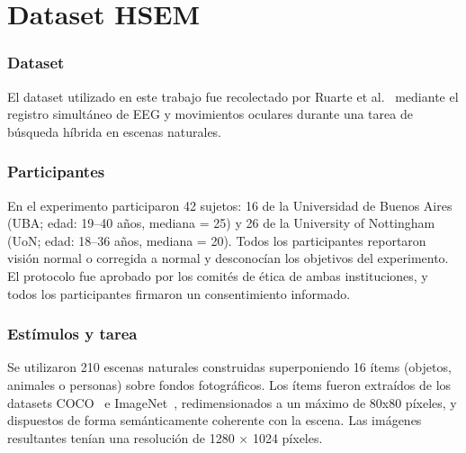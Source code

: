 \section{Dataset HSEM}
\label{sec:dataset_hsem}


\subsubsection{Dataset}


El dataset utilizado en este trabajo fue recolectado por
Ruarte et al.~\citep{ruarte2025} mediante el registro simultáneo de EEG y movimientos 
oculares durante una tarea de búsqueda híbrida en escenas naturales.

\subsubsection{Participantes}

En el experimento participaron 42 sujetos: 16 de la Universidad de Buenos Aires (UBA; edad: 19--40 años, mediana = 25) y 26 de la University of Nottingham (UoN; edad: 18--36 años, mediana = 20). Todos los participantes reportaron visión normal o corregida a normal y desconocían los objetivos del 
experimento. El protocolo fue aprobado por los comités de ética de ambas 
instituciones, y todos los participantes firmaron un consentimiento 
informado.

\subsubsection{Estímulos y tarea}

Se utilizaron 210 escenas naturales construidas superponiendo 16 ítems 
(objetos, animales o personas) sobre fondos fotográficos. 
Los ítems fueron extraídos de los datasets COCO~\citep{lin2014coco} e ImageNet~\citep{deng2009imagenet}, redimensionados a un máximo de 80x80 píxeles, y dispuestos de forma semánticamente coherente con la escena. Las 
imágenes resultantes tenían una resolución de 1280 × 1024 píxeles.

